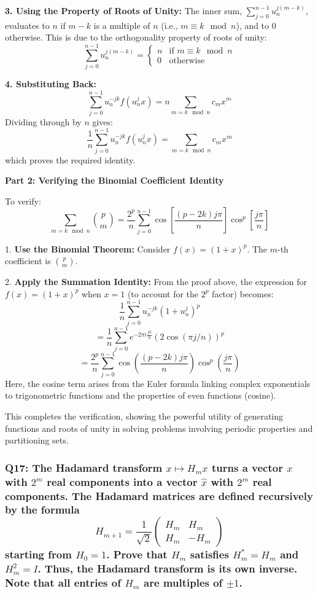 \documentclass[8pt]{article}
\begin{document}
{\textbf{3. Using the Property of Roots of Unity:}
   The inner sum, \(\sum_{j=0}^{n-1} u_n^{j(m-k)}\), evaluates to \( n \) if \( m-k \) is a multiple of \( n \) (i.e., \( m \equiv k \mod n \)), and to 0 otherwise. This is due to the orthogonality property of roots of unity:
   \[
   \sum_{j=0}^{n-1} u_n^{j(m-k)} = \begin{cases}
   n & \text{if } m \equiv k \mod n \\
   0 & \text{otherwise}
   \end{cases}
   \]

\textbf{4. Substituting Back:}
   \[
   \sum_{j=0}^{n-1} u_n^{-jk} f(u_n^j x) = n \sum_{m = k \mod n} c_m x^m
   \]
   Dividing through by \( n \) gives:
   \[
   \frac{1}{n} \sum_{j=0}^{n-1} u_n^{-jk} f(u_n^j x) = \sum_{m = k \mod n} c_m x^m
   \]
   which proves the required identity.

\textbf{Part 2: Verifying the Binomial Coefficient Identity}

To verify:
\[
\sum_{m = k \mod n} \binom{p}{m} = \frac{2^p}{n} \sum_{j=0}^{n-1} \cos \left[ \frac{(p - 2k)j\pi}{n} \right] \cos^p \left[ \frac{j\pi}{n} \right]
\]

1. \textbf{Use the Binomial Theorem:}
   Consider \( f(x) = (1 + x)^p \). The \( m \)-th coefficient is \( \binom{p}{m} \).

2. \textbf{Apply the Summation Identity:}
   From the proof above, the expression for \( f(x) = (1 + x)^p \) when \( x = 1 \) (to account for the \( 2^p \) factor) becomes:
   \[
   \frac{1}{n} \sum_{j=0}^{n-1} u_n^{-jk} (1 + u_n^j)^p
   \]
   \[
   = \frac{1}{n} \sum_{j=0}^{n-1} e^{-2\pi i \frac{jk}{n}} (2 \cos(\pi j/n))^p
   \]
   \[
   = \frac{2^p}{n} \sum_{j=0}^{n-1} \cos \left(\frac{(p - 2k)j\pi}{n}\right) \cos^p \left(\frac{j\pi}{n}\right)
   \]
   Here, the cosine term arises from the Euler formula linking complex exponentials to trigonometric functions and the properties of even functions (cosine).

This completes the verification, showing the powerful utility of generating functions and roots of unity in solving problems involving periodic properties and partitioning sets.

\subsubsection*{Q17:
The Hadamard transform \(x \mapsto H_m x\) turns a vector \(x\) with \(2^m\) real components into a vector \(\hat{x}\) with \(2^m\) real components. The Hadamard matrices are defined recursively by the formula
\[
H_{m+1} = \frac{1}{\sqrt{2}} \begin{pmatrix} H_m & H_m \\ H_m & -H_m \end{pmatrix}
\]
starting from \(H_0 = 1\). Prove that \(H_m\) satisfies \(H_m^* = H_m\) and \(H_m^2 = I\). Thus, the Hadamard transform is its own inverse. Note that all entries of \(H_m\) are multiples of \(\pm 1\).}

}
\end{document}
